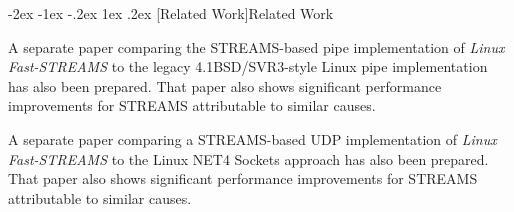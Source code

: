 \documentclass[letterpaper,final,notitlepage,twocolumn,10pt,twoside]{article}
\makeatletter
\renewcommand\section{\@startsection {section}{1}{\z@}%
                                   {-2ex \@plus -1ex \@minus -.2ex}%
                                   {1ex \@plus .2ex}%
                                   {\normalfont\large\bfseries}}
\makeatother
\begin{document}
\section[Related Work]{Related Work}

A separate paper comparing the STREAMS-based pipe implementation of \textsl{Linux Fast-STREAMS} to
the legacy 4.1BSD/SVR3-style Linux pipe implementation has also been prepared.  That paper also
shows significant performance improvements for STREAMS attributable to similar causes.

A separate paper comparing a STREAMS-based UDP implementation of \textsl{Linux Fast-STREAMS} to the
Linux NET4 Sockets approach has also been prepared.  That paper also shows significant performance
improvements for STREAMS attributable to similar causes.

\FloatBarrier
{}

\end{document}
